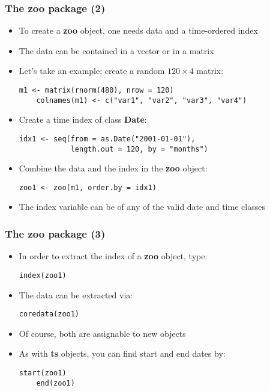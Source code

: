 \documentclass[10pt]{beamer}
\theoremstyle{definition}
\begin{document}
\begin{frame}[fragile]
\frametitle{The \textbf{zoo} package (2)}
\begin{itemize}
	\item To create a \textbf{zoo} object, one needs data and a time-ordered index
	\item The data can be contained in a vector or in a matrix
	\item Let's take an example; create a random $120 \times 4$ matrix:
	
	\begin{lstlisting}[style = rstyle, breaklines]
	m1 <- matrix(rnorm(480), nrow = 120)
	colnames(m1) <- c("var1", "var2", "var3", "var4")
	\end{lstlisting}
	
	\item Create a time index of class \textbf{Date}:
	
	\begin{lstlisting}[style = rstyle, breaklines]
	idx1 <- seq(from = as.Date("2001-01-01"), 
            length.out = 120, by = "months")
	\end{lstlisting}
	
	\item Combine the data and the index in the \textbf{zoo} object:
	\begin{lstlisting}[style = rstyle, breaklines]
	zoo1 <- zoo(m1, order.by = idx1)
	\end{lstlisting}
	\item The index variable can be of any of the valid date and time classes
\end{itemize}
\end{frame}

\begin{frame}[fragile]
\frametitle{The \textbf{zoo} package (3)}
\begin{itemize}
	\item In order to extract the index of a \textbf{zoo} object, type:
	\begin{lstlisting}[style = rstyle, breaklines]
	index(zoo1)
	\end{lstlisting}
	\item The data can be extracted via:
	\begin{lstlisting}[style = rstyle, breaklines]
	coredata(zoo1)
	\end{lstlisting}
	\item Of course, both are assignable to new objects
	\item As with \textbf{ts} objects, you can find start and end dates by:
	\begin{lstlisting}[style = rstyle, breaklines]
	start(zoo1)
	end(zoo1)
	\end{lstlisting}
\end{itemize}
\end{frame}
\end{document}
